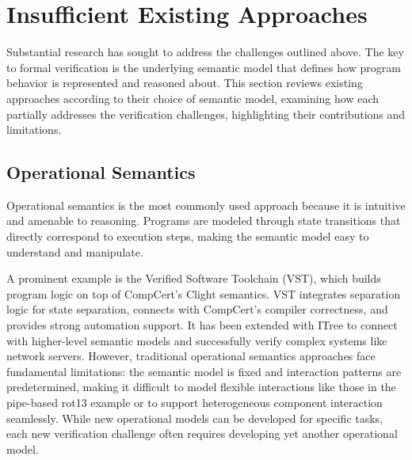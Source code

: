 \section{Insufficient Existing Approaches}
\label{sec:intro:litreview}

Substantial research has sought to
address the challenges outlined above.
The key to formal verification
is the underlying semantic model that defines
how program behavior is represented and reasoned about.
This section reviews existing approaches
according to their choice of semantic model,
examining how each partially addresses
the verification challenges,
highlighting their contributions and limitations.

\subsection{Operational Semantics}

Operational semantics is the most commonly used approach
because it is intuitive and amenable to reasoning.
Programs are modeled through state transitions
that directly correspond to execution steps,
making the semantic model easy to understand and manipulate.


A prominent example is the Verified Software Toolchain (VST)\citep{vst},
which builds program logic on top of CompCert's Clight semantics.
VST integrates separation logic for state separation,
connects with CompCert's compiler correctness,
and provides strong automation support.
It has been extended with ITree\citep{itree}
to connect with higher-level semantic models
and successfully verify complex systems like network servers\citep{itrees}.
However, traditional operational semantics approaches
face fundamental limitations:
the semantic model is fixed
and interaction patterns are predetermined,
making it difficult to model flexible interactions
like those in the pipe-based rot13 example
or to support heterogeneous component interaction seamlessly.
While new operational models can be developed for specific tasks,
each new verification challenge
often requires developing yet another operational model.

